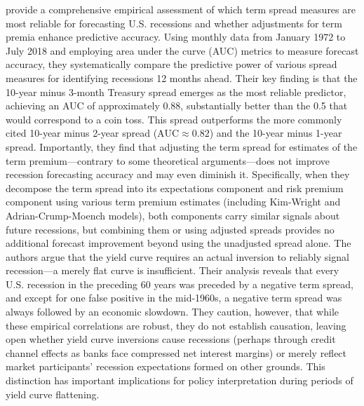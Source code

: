 \citet{bauer2018information} provide a comprehensive empirical assessment of which term spread measures are most reliable for forecasting U.S. recessions and whether adjustments for term premia enhance predictive accuracy. Using monthly data from January 1972 to July 2018 and employing area under the curve (AUC) metrics to measure forecast accuracy, they systematically compare the predictive power of various spread measures for identifying recessions 12 months ahead. Their key finding is that the 10-year minus 3-month Treasury spread emerges as the most reliable predictor, achieving an AUC of approximately 0.88, substantially better than the 0.5 that would correspond to a coin toss. This spread outperforms the more commonly cited 10-year minus 2-year spread ($\text{AUC} \approx 0.82$) and the 10-year minus 1-year spread. Importantly, they find that adjusting the term spread for estimates of the term premium—contrary to some theoretical arguments—does not improve recession forecasting accuracy and may even diminish it. Specifically, when they decompose the term spread into its expectations component and risk premium component using various term premium estimates (including Kim-Wright and Adrian-Crump-Moench models), both components carry similar signals about future recessions, but combining them or using adjusted spreads provides no additional forecast improvement beyond using the unadjusted spread alone. The authors argue that the yield curve requires an actual inversion to reliably signal recession—a merely flat curve is insufficient. Their analysis reveals that every U.S. recession in the preceding 60 years was preceded by a negative term spread, and except for one false positive in the mid-1960s, a negative term spread was always followed by an economic slowdown. They caution, however, that while these empirical correlations are robust, they do not establish causation, leaving open whether yield curve inversions cause recessions (perhaps through credit channel effects as banks face compressed net interest margins) or merely reflect market participants' recession expectations formed on other grounds. This distinction has important implications for policy interpretation during periods of yield curve flattening.

